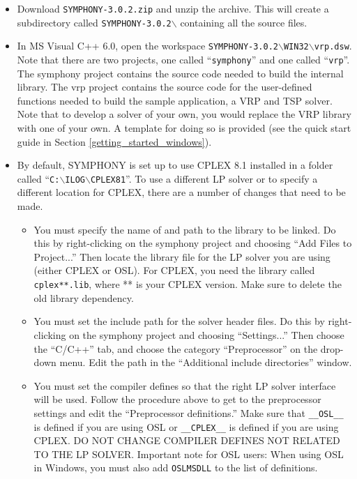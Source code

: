 \begin{itemize}

\item Download {\tt SYMPHONY-3.0.2.zip} and unzip the archive. This will
create a subdirectory called {\tt SYMPHONY-3.0.2$\backslash$} containing all 
the source files.

\item In MS Visual C++ 6.0, open the workspace 
{\tt SYMPHONY-3.0.2$\backslash$WIN32$\backslash$vrp.dsw}.  Note that there are
two projects, one called ``{\tt symphony}'' and one called ``{\tt vrp}''.  The
symphony project contains the source code needed to build the internal
library. The vrp project contains the source code for the user-defined
functions needed to build the sample application, a VRP and TSP solver. Note
that to develop a solver of your own, you would replace the VRP library with
one of your own. A template for doing so is provided (see the quick start
guide in Section \ref{getting_started_windows}).

\item By default, SYMPHONY is set up to use CPLEX 8.1 installed in a folder
called ``{\tt C:$\backslash$ILOG$\backslash$CPLEX81}''. To use a different LP 
solver or to specify a different location for CPLEX, there are a number of 
changes that need to be made.

\begin{itemize}

\item You must specify the name of and path to the library to be linked. Do 
this by right-clicking on the symphony project and choosing ``Add Files to
Project...'' Then locate the library file for the LP solver you are using
(either CPLEX or OSL). For CPLEX, you need the library called {\tt
cplex**.lib}, where ** is your CPLEX version. Make sure to delete the old
library dependency.

\item You must set the include path for the solver header files. Do this
by right-clicking on the symphony project and choosing ``Settings...'' Then
choose the ``C/C++'' tab, and choose the category ``Preprocessor'' on the
drop-down menu.  Edit the path in the ``Additional include directories'' 
window.

\item You must set the compiler defines so that the right LP solver interface
will be used. Follow the procedure above to get to the preprocessor settings
and edit the ``Preprocessor definitions.'' Make sure that {\tt \_\_OSL\_\_} is
defined if you are using OSL or {\tt \_\_CPLEX\_\_} is defined if you are
using CPLEX. DO NOT CHANGE COMPILER DEFINES NOT RELATED TO THE LP
SOLVER. Important note for OSL users: When using OSL in Windows, you must also add \texttt{OSLMSDLL} to the list of definitions. 


\end{itemize}
\end{itemize}
